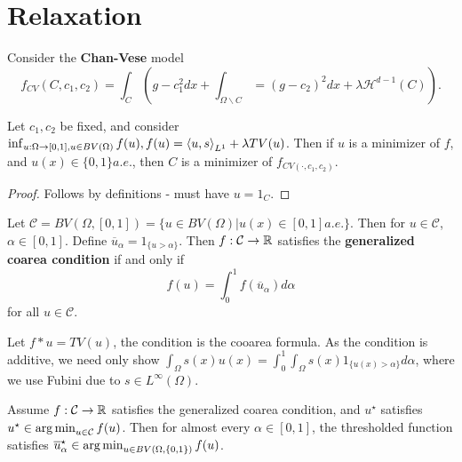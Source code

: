 \section{Relaxation}
\label{sec:relaxation}

\begin{defn}
  Consider the \textbf{Chan-Vese} model
  \begin{equation}
    \label{eq:58}
    f_{CV}(C, c_{1}, c_{2}) = \int_{C} (g - c_{1}^{2} dx +
    \int_{\Omega \backslash C} = (g - c_{2})^{2} dx + \lambda \mathcal{H}^{d-1}(C)).
  \end{equation}
\end{defn}

\begin{thm}
  Let $c_{1}, c_{2}$ be fixed, and consider $\inf_{u: \Omega
    \rightarrow [0, 1], u \in BV(\Omega)} f(u), f(u) = \IP{u,
    s}_{L^{1}} + \lambda TV(u)$.  Then if $u$ is a minimizer of $f$,
  and $u(x) \in \{ 0, 1 \} a.e.$, then $C$ is a minimizer of
  $f_{CV(\cdot, c_{1}, c_{2})}$.
\end{thm}

\begin{proof}
  Follows by definitions - must have $u = 1_{C}$.
\end{proof}

\begin{defn}
  Let $\mathcal{C} = BV(\Omega, [0, 1]) = \{ u \in BV(\Omega) | u(x)
  \in [0, 1] a.e. \}$.  Then for $u \in \mathcal{C}$, $\alpha \in [0,
  1]$.  Define $\overline u_{\alpha} = 1_{\{ u > \alpha \} }$. Then
  $f: \mathcal{C} \rightarrow \mathbb{R}$ satisfies the \textbf{generalized
    coarea condition} if and only if
  \begin{equation}
    \label{eq:59}
    f(u) = \int_{0}^{1} f(\overline u_{\alpha}) d\alpha
  \end{equation} for all $u \in \mathcal{C}$.
\end{defn}

\begin{thm}
  Let $f*u = TV(u)$, the condition is the cooarea formula.  As the
  condition is additive, we need only show $\int_{\Omega} s(x) u(x)
  = \int_{0}^{1} \int_{\Omega} s(x) 1_{\{ u(x) > \alpha \}} d\alpha$,
  where we use Fubini due to $s \in L^{\infty}(\Omega)$.
\end{thm}

\begin{thm}
  Assume $f: \mathcal{C} \rightarrow \mathbb{R}$ satisfies the generalized
  coarea condition, and $u^{\star}$ satisfies $u^{\star} \in
  \operatorname*{arg\,min}_{u \in \mathcal{C}} f(u)$. Then for almost every $\alpha \in
  [0, 1]$, the thresholded function satisfies $\overline
  u_{\alpha}^{\star} \in \operatorname*{arg\,min}_{u \in BV(\Omega, \{ 0, 1 \})} f(u)$.
\end{thm}

